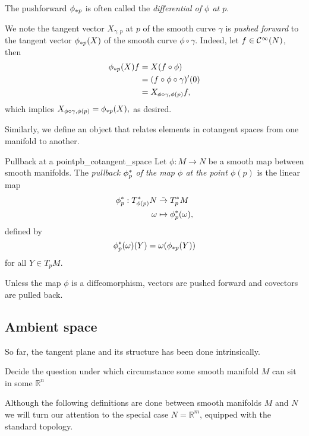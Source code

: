 \begin{remark}
    The pushforward \(\pf[p]{\phi}\) is often called the \emph{differential of \(\phi\) at \(p\)}.
\end{remark}

We note the tangent vector \(X_{\gamma,p}\) at \(p\) of the smooth curve \(\gamma\) is \emph{pushed forward} to the tangent vector \(\pf[p]{\phi}(X)\) of the smooth curve \(\phi \circ \gamma.\) Indeed, let \(f \in \smooth{N}\), then
\begin{align*}
    \pf[p]\phi(X)f &= X(f \circ \phi)\\
                   &= (f \circ \phi \circ \gamma)'(0)\\
                   &= X_{\phi \circ \gamma, \phi(p)} f,
\end{align*}
which implies \(X_{\phi \circ \gamma, \phi(p)} = \pf[p]\phi(X),\) as desired.

Similarly, we define an object that relates elements in cotangent spaces from one manifold to another.

\begin{definition}{Pullback at a point}{pb_cotangent_space}
    Let \(\phi : M \to N\) be a smooth map between smooth manifolds. The \emph{pullback \(\pb[p]\phi\) of the map \(\phi\) at the point \(\phi(p)\)} is the linear map
    \begin{align*}
        \pb[p]\phi : T_{\phi(p)}^{\ast}N &\linear T_{p}^{\ast}M\\
        \omega &\mapsto \pb[p]\phi(\omega),
    \end{align*}
    defined by
    \begin{equation*}
        \pb[p]\phi(\omega)(Y) = \omega(\pf[p]\phi(Y))
    \end{equation*}
    for all \(Y \in T_pM\).
\end{definition}
\begin{remark}
    Unless the map \(\phi\) is a diffeomorphism, vectors are pushed forward and covectors are pulled back.
\end{remark}

\subsection{Ambient space}
So far, the tangent plane and its structure has been done intrinsically.

Decide the question under which circumstance some smooth manifold \(M\) can sit in some \(\mathbb{R}^n\)

Although the following definitions are done between smooth manifolds \(M\) and \(N\) we will turn our attention to the special case \(N=\mathbb{R}^m\), equipped with the standard topology.

